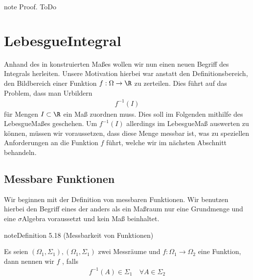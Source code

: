 \documentclass[letterpaper,10pt,german]{jupyterBook}
\begin{document}
\begin{sphinxadmonition}{note}
\sphinxAtStartPar
Proof. ToDo
\end{sphinxadmonition}


\section{Lebesgue\sphinxhyphen{}Integral}
\label{\detokenize{masstheorie/lebesgue_integral:lebesgue-integral}}\label{\detokenize{masstheorie/lebesgue_integral::doc}}
\sphinxAtStartPar
Anhand des in {\hyperref[\detokenize{masstheorie/masstheorie:s-lebesguemeasure}]{}} konstruierten Maßes wollen wir nun einen neuen Begriff des Integrals herleiten. Unsere Motivation hierbei war anstatt den Definitionsbereich, den Bildbereich einer Funktion \(f:\Omega\to\R\) zu zerteilen. Dies führt auf das Problem, dass man Urbildern
\begin{equation*}
\begin{split}f^{-1}(I)\end{split}
\end{equation*}
\sphinxAtStartPar
für Mengen \(I\subset\R\) ein Maß zuordnen muss. Dies soll im Folgenden mithilfe des Lebesgue\sphinxhyphen{}Maßes geschehen. Um \(f^{-1}(I)\) allerdings im Lebesgue\sphinxhyphen{}Maß auswerten zu können, müssen wir voraussetzen, dass diese Menge messbar ist, was zu speziellen Anforderungen an die Funktion \(f\) führt, welche wir im nächsten Abschnitt behandeln.


\subsection{Messbare Funktionen}
\label{\detokenize{masstheorie/lebesgue_integral:messbare-funktionen}}
\sphinxAtStartPar
Wir beginnen mit der Definition von messbaren Funktionen. Wir benutzen hierbei den Begriff eines  der anders als ein Maßraum nur eine Grundmenge und eine \(\sigma\)\sphinxhyphen{}Algebra voraussetzt und kein Maß beinhaltet.
\label{masstheorie/lebesgue_integral:definition-0}
\begin{sphinxadmonition}{note}{Definition 5.18 (Messbarkeit von Funktionen)}



\sphinxAtStartPar
Es seien \((\Omega_1,\Sigma_1), (\Omega_1,\Sigma_1)\) zwei Messräume und \(f:\Omega_1\to\Omega_2\) eine Funktion, dann nennen wir \(f\) , falls
\begin{equation*}
\begin{split}f^{-1}(A)\in\Sigma_1\quad\forall A\in\Sigma_2\end{split}
\end{equation*}\end{sphinxadmonition}
\end{document}
